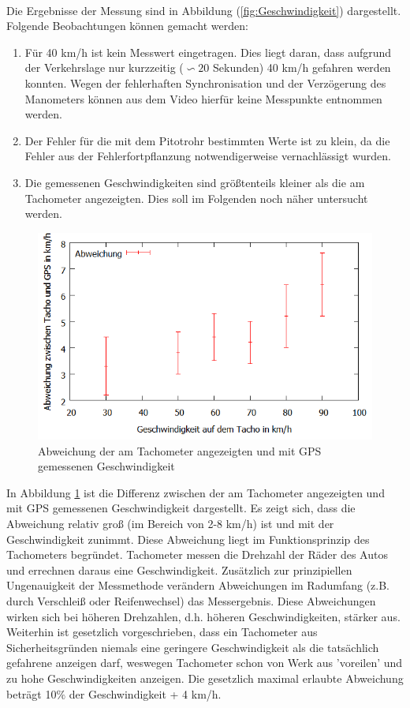 \\
Die Ergebnisse der Messung sind in Abbildung (\ref{fig:Geschwindigkeit}) dargestellt. Folgende Beobachtungen können gemacht werden:
\begin{enumerate}
\item Für 40 km/h ist kein Messwert eingetragen. Dies liegt daran, dass aufgrund der Verkehrslage nur kurzzeitig ($\backsim 20$ Sekunden) 40 km/h gefahren werden konnten. Wegen der fehlerhaften Synchronisation und der Verzögerung des Manometers können aus dem Video hierfür keine Messpunkte entnommen werden.
\item Der Fehler für die mit dem Pitotrohr bestimmten Werte ist zu klein, da die Fehler aus der Fehlerfortpflanzung notwendigerweise vernachlässigt wurden.
\item Die gemessenen Geschwindigkeiten sind größtenteils kleiner als die am Tachometer angezeigten. Dies soll im Folgenden noch näher untersucht werden.
\end{enumerate}
\begin{figure}
      \includegraphics[width=.9\textwidth]{images/AbweichungGPSTacho}
\caption{Abweichung der am Tachometer angezeigten und mit GPS gemessenen Geschwindigkeit}
\label{fig:AbweichungGPSTacho}
\end{figure}
In Abbildung \ref{fig:AbweichungGPSTacho} ist die Differenz zwischen der am Tachometer angezeigten und mit GPS gemessenen Geschwindigkeit dargestellt. Es zeigt sich, dass die Abweichung relativ groß (im Bereich von 2-8 km/h) ist und mit der Geschwindigkeit zunimmt. Diese Abweichung liegt im Funktionsprinzip des Tachometers begründet. Tachometer messen die Drehzahl der Räder des Autos und errechnen daraus eine Geschwindigkeit. Zusätzlich zur prinzipiellen Ungenauigkeit der Messmethode verändern Abweichungen im Radumfang (z.B. durch Verschleiß oder Reifenwechsel) das Messergebnis. Diese Abweichungen wirken sich bei höheren Drehzahlen, d.h. höheren Geschwindigkeiten, stärker aus. Weiterhin ist gesetzlich vorgeschrieben, dass ein Tachometer aus Sicherheitsgründen niemals eine geringere Geschwindigkeit als die tatsächlich gefahrene anzeigen darf, weswegen Tachometer schon von Werk aus 'voreilen' und zu hohe Geschwindigkeiten anzeigen. Die gesetzlich maximal erlaubte Abweichung beträgt 10$\%$ der Geschwindigkeit + 4 km/h.
